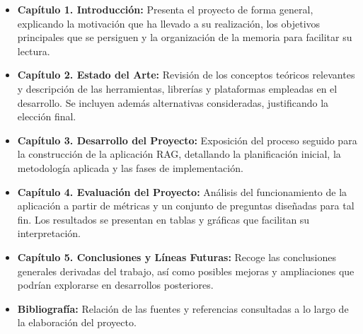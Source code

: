 	\begin{itemize}
		\item \textbf{Capítulo 1. Introducción:} Presenta el proyecto de forma general, explicando la motivación que ha llevado a su realización, los objetivos principales que se persiguen y la organización de la memoria para facilitar su lectura.		
		\item \textbf{Capítulo 2. Estado del Arte:} Revisión de los conceptos teóricos relevantes y descripción de las herramientas, librerías y plataformas empleadas en el desarrollo. Se incluyen además alternativas consideradas, justificando la elección final.		
		\item \textbf{Capítulo 3. Desarrollo del Proyecto:} Exposición del proceso seguido para la construcción de la aplicación RAG, detallando la planificación inicial, la metodología aplicada y las fases de implementación.		
		\item \textbf{Capítulo 4. Evaluación del Proyecto:} Análisis del funcionamiento de la aplicación a partir de métricas y un conjunto de preguntas diseñadas para tal fin. Los resultados se presentan en tablas y gráficas que facilitan su interpretación.		
		\item \textbf{Capítulo 5. Conclusiones y Líneas Futuras:} Recoge las conclusiones generales derivadas del trabajo, así como posibles mejoras y ampliaciones que podrían explorarse en desarrollos posteriores.		
		\item \textbf{Bibliografía:} Relación de las fuentes y referencias consultadas a lo largo de la elaboración del proyecto.
	\end{itemize}
	

\endgroup